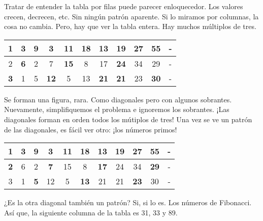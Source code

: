 Tratar de entender la tabla por filas puede parecer enloquecedor. 
Los valores crecen, decrecen, etc. Sin ningún patrón aparente. 
Si lo miramos por columnas, la cosa no cambia. Pero, hay que ver 
la tabla entera. Hay muchos múltiplos de tres.

\vspace{2mm}
\begin{center}
    \begin{tabular}{ |c|c|c|c|c|c|c|c|c|c|c| }
        \hline
        1 & \textbf{3} &  \textbf{9} &  \textbf{3} & 11 &  \textbf{18} & 13 & 19 &  \textbf{27} & 55 & - \\
        \hline
        2 &  \textbf{6} & 2 & 7 &  \textbf{15} & 8 & 17 &  \textbf{24} & 34  & 29 & -\\
        \hline
        \textbf{3} & 1 & 5 &  \textbf{12} & 5 & 13 &  \textbf{21} &  \textbf{21} & 23 &  \textbf{30} & -\\
        \hline
    \end{tabular}
\end{center}

\vspace{2mm}

Se forman una figura, rara. Como diagonales pero con algunos sobrantes. 
Nuevamente, simplifiquemos el problema e ignoremos los sobrantes. 
¡Las diagonales forman en orden todos los mútiplos de tres! Una vez se 
ve un patrón de las diagonales, es fácil ver otro: ¡los números primos!

\vspace{2mm}

\begin{center}
    \begin{tabular}{ |c|c|c|c|c|c|c|c|c|c|c| }
        \hline
        1 &  \textbf{3} & 9 & 3 &  \textbf{11} & 18 & 13 &  \textbf{19} & 27 & 55 & - \\
        \hline
        \textbf{2} & 6 & 2 &  \textbf{7} & 15 & 8 &  \textbf{17} & 24 & 34  &  \textbf{29} & -\\
        \hline
        3 & 1 &  \textbf{5} & 12 & 5 &  \textbf{13} & 21 & 21 &  \textbf{23} & 30 & -\\
        \hline
    \end{tabular}
\end{center}

\vspace{2mm}

¿Es la otra diagonal también un patrón? Si, si lo es. Los números de Fibonacci. 
Así que, la siguiente columna de la tabla es 31, 33 y 89.

